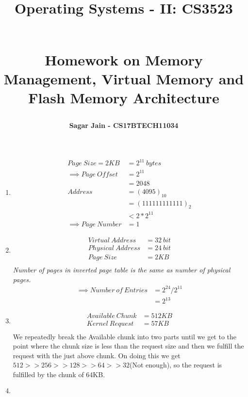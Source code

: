 \documentclass[a4paper,12pt]{report}
\begin{document}
\title{
\textbf{Operating Systems - II: CS3523}\\~\\
\begin{large}
\textbf{Homework on Memory Management, Virtual Memory and Flash Memory Architecture}\\
\end{large}
}
\author{\textbf{Sagar Jain - CS17BTECH11034}\\}
\maketitle
\begin{enumerate}
\item 
\begin{align*}
Page\:Size = 2KB &= 2^{11}\: bytes \\
\implies Page\: Offset &= 2^{11} \\ &= 2048 \\
Address &= (4095)_{10}\\&=(111111111111)_2\\
&< 2*2^{11}\\
\implies Page\:Number &= 1
\end{align*}
\item
\begin{align*}
Virtual\:Address &= 32\:bit\\
Physical\:Address &= 24\:bit\\
Page\: Size &= 2KB\\
\end{align*}
\textit{Number of pages in inverted page table is the same as number of physical pages.}\\
\begin{align*}
\implies Number\:of\:Entries &= 2^{24}/2^{11}\\
&= 2^{13}
\end{align*}
\item 
\begin{align*}
Available\:Chunk &= 512KB\\
Kernel\:Request &= 57KB\\
\end{align*}
We repeatedly break the Available chunk into two parts until we get to the point where the chunk size is less than the request size and then we fulfill the request with the just above chunk.
On doing this we get $512>>256>>128>>64>>32$(Not enough), so the request is fulfilled by the chunk of 64KB.
\item \begin{enumerate}

\end{enumerate}
\end{enumerate}
\end{document}
